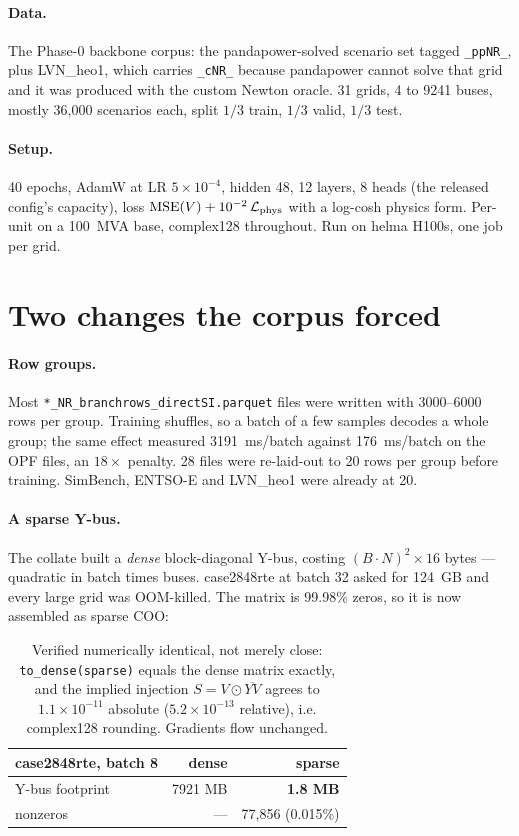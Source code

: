 \documentclass[10pt]{article}
\begin{document}
\paragraph{Data.} The Phase-0 backbone corpus: the pandapower-solved scenario
set tagged \texttt{\_ppNR\_}, plus LVN\_heo1, which carries \texttt{\_cNR\_}
because pandapower cannot solve that grid and it was produced with the custom
Newton oracle. 31 grids, 4 to 9241 buses, mostly 36{,}000 scenarios each, split
$1/3$ train, $1/3$ valid, $1/3$ test.

\paragraph{Setup.} 40 epochs, AdamW at LR $5\times10^{-4}$, hidden 48, 12
layers, 8 heads (the released config's capacity), loss
$\mathrm{MSE}(V) + 10^{-2}\,\mathcal{L}_{\rm phys}$ with a log-cosh physics
form. Per-unit on a 100~MVA base, complex128 throughout. Run on helma H100s,
one job per grid.

\section{Two changes the corpus forced}

\paragraph{Row groups.} Most \texttt{*\_NR\_branchrows\_directSI.parquet} files
were written with 3000--6000 rows per group. Training shuffles, so a batch of a
few samples decodes a whole group; the same effect measured 3191~ms/batch
against 176~ms/batch on the OPF files, an $18\times$ penalty. 28 files were
re-laid-out to 20 rows per group before training. SimBench, ENTSO-E and
LVN\_heo1 were already at 20.

\paragraph{A sparse Y-bus.} The collate built a \emph{dense} block-diagonal
Y-bus, costing $(B\!\cdot\!N)^2\times16$ bytes --- quadratic in batch times
buses. case2848rte at batch 32 asked for 124~GB and every large grid was
OOM-killed. The matrix is 99.98\% zeros, so it is now assembled as sparse COO:

\begin{table}[H]
\centering
\small
\begin{tabular}{lrr}
\toprule
case2848rte, batch 8 & dense & sparse \\
\midrule
Y-bus footprint & 7921 MB & \textbf{1.8 MB} \\
nonzeros & --- & 77{,}856 (0.015\%) \\
\bottomrule
\end{tabular}
\caption{Verified numerically identical, not merely close:
\texttt{to\_dense(sparse)} equals the dense matrix exactly, and the implied
injection $S = V\odot\overline{YV}$ agrees to $1.1\times10^{-11}$ absolute
($5.2\times10^{-13}$ relative), i.e. complex128 rounding. Gradients flow
unchanged.}
\end{table}
\end{document}
